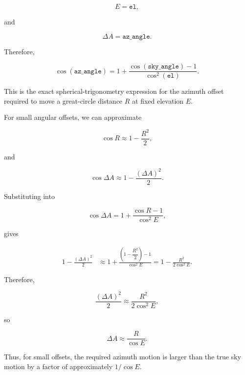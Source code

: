\documentclass[12pt]{extarticle}
\begin{document}
\begin{equation} E = \texttt{el}, \end{equation}

and

\begin{equation} \Delta A = \texttt{az\_angle}. \end{equation}

Therefore,

\begin{equation}
\boxed{
\cos(\texttt{az\_angle})=
1+
\frac{\cos(\texttt{sky\_angle})-1}{\cos^2(\texttt{el})}
}.
\end{equation}

This is the exact spherical-trigonometry expression for the azimuth offset required to move a great-circle distance $R$ at fixed elevation $E$.

For small angular offsets, we can approximate

\begin{equation} \cos R \approx 1 - \frac{R^2}{2}, \end{equation}

and

\begin{equation} \cos\Delta A \approx 1 - \frac{(\Delta A)^2}{2}. \end{equation}

Substituting into

\begin{equation}
\cos\Delta A=1+
\frac{\cos R-1}{\cos^2 E},
\end{equation}

gives

\begin{align}
1-\frac{(\Delta A)^2}{2}
&\approx
1+
\frac{
\left(1-\dfrac{R^2}{2}\right)-1
}{
\cos^2 E
}=
1-\frac{R^2}{2\cos^2 E}.
\end{align}

Therefore,

\begin{equation}
\frac{(\Delta A)^2}{2}
\approx
\frac{R^2}{2\cos^2 E},
\end{equation}

so

\begin{equation}
\boxed{
\Delta A \approx \frac{R}{\cos E}
}.
\end{equation}

Thus, for small offsets, the required azimuth motion is larger than the true sky motion by a factor of approximately $1/\cos E$.
\end{document}
